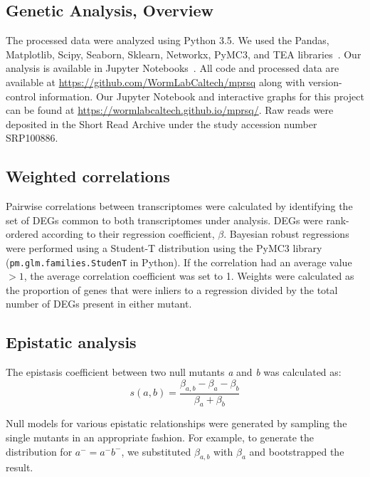 \documentclass[9pt,twocolumn,twoside]{pnas-new}
\newcommand{\gene}[1]{\mbox{\emph{#1}}}
\begin{document}
{\subsection*{Genetic Analysis, Overview}
The processed data were analyzed using Python 3.5. We used the Pandas,
Matplotlib, Scipy, Seaborn, Sklearn, Networkx, PyMC3, and TEA
libraries~\cite{McKinney2011,Oliphant2007,
Pedregosa2012,Salvatier2015,VanDerWalt2011,Hunter2007,Angeles-Albores2016,Waskom}.
Our analysis is available in Jupyter Notebooks~\cite{Perez2007}. All code and
processed data are available at
\url{https://github.com/WormLabCaltech/mprsq} along with version-control
information. Our Jupyter Notebook and interactive graphs for this project can be
found at \url{https://wormlabcaltech.github.io/mprsq/}. Raw reads were deposited
in the Short Read Archive under the study accession number SRP100886.

\subsection*{Weighted correlations}
Pairwise correlations between transcriptomes were calculated by identifying the
set of DEGs common to both transcriptomes under
analysis. DEGs were rank-ordered according to their regression coefficient,
$\beta$. Bayesian robust regressions were performed using a Student-T
distribution using the PyMC3 library~\cite{Salvatier2015}
(\texttt{pm.glm.families.StudenT} in Python). If the correlation had an average
value $>1$, the average correlation coefficient was set to 1.
Weights were calculated as the proportion of genes that were inliers to a
regression divided by the total number of DEGs present
in either mutant.

\subsection*{Epistatic analysis}
The epistasis coefficient between two null mutants \gene{a} and \gene{b} was
calculated as:
\begin{equation}
  s(a, b) = \frac{\beta_{a,b} - \beta_a - \beta_b}{\beta_a + \beta_b}
\label{eq:epistasis_coef}
\end{equation}

Null models for various epistatic relationships were generated by sampling the
single mutants in an appropriate fashion. For example, to generate the
distribution for $a^- = a^-b^-$, we substituted $\beta_{a, b}$ with $\beta_a$
and bootstrapped the result.

}
\end{document}

